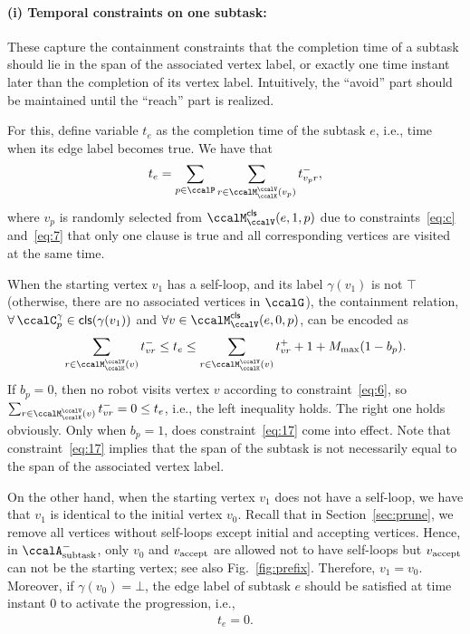 \documentclass[Afour,sageh,times]{sagej}
\newcommand{\clause}[1]{\mathsf{cls}(#1)}
\newcommand{\auto}[1]{\ccalA_{\textup{#1}}}
\newcommand{\vertex}[1]{v_{\textup{#1}}}
\begin{document}
{{{{\paragraph{(i) Temporal constraints on one subtask:}\label{sec:onesubtask} These capture the containment constraints that the completion time of a subtask should lie in the span of the associated vertex label, or exactly one time instant later than the completion of its vertex label. Intuitively, the ``avoid'' part should be maintained until the ``reach'' part is realized.

For this, define variable  $t_e$ as the completion time of the subtask $e$, i.e., time when its edge label  becomes true. We have  that
\begingroup\makeatletter\def\f@size{10}\check@mathfonts
\def\maketag@@@#1{\hbox{\m@th\normalsize\normalfont#1}}%
\begin{align}\label{eq:edgetime}
  t_e = \sum_{p\in \ccalP} \sum_{r\in \ccalM^\ccalV_{\ccalK}(v_p)}t_{v_p r}^-,
\end{align}
\endgroup
where $v_p$ is randomly selected from $\ccalM^\mathsf{cls}_\ccalV(e,1,p)$ due to constraints~\eqref{eq:c} and~\eqref{eq:7} that only one clause is true and all corresponding vertices are visited at the same time.

When the starting vertex $v_1$ has a self-loop, and its label $\gamma(v_1)$ is not  $\top$ (otherwise, there are no associated vertices in $\ccalG$), the containment relation, $\forall\, \ccalC_p^{\gamma} \in \clause{\gamma(v_1)}$ and $\forall v \in \ccalM^\mathsf{cls}_\ccalV(e,0,p)$, can be encoded as
\begingroup\makeatletter\def\f@size{10}\check@mathfonts
\def\maketag@@@#1{\hbox{\m@th\normalsize\normalfont#1}}%
  \begin{align}
 \sum_{r\in \ccalM^\ccalV_{\ccalK}(v)} t_{vr}^-   \leq  t_e \leq
    \sum_{r\in \ccalM^\ccalV_{\ccalK}(v)} t_{vr}^+ + 1  + M_{\text{max}} (1 - b_{p}). \label{eq:17}
  \end{align}
  \endgroup
  If $b_p=0$, then no robot visits vertex $v$ according to constraint~\eqref{eq:6}, so~$ \sum_{r\in \ccalM^\ccalV_{\ccalK}(v)} t_{vr}^- = 0 \leq t_e$, i.e., the left inequality holds. The right one holds obviously. Only when $b_p=1$, does constraint~\eqref{eq:17} come into effect. Note that constraint~\eqref{eq:17} implies that the span of the subtask is not necessarily equal to the span of the associated vertex label.

  On the other hand, when the starting vertex $v_1$ does not have a self-loop, we have that $v_1$ is identical to the initial vertex $v_0$. Recall that in Section~\ref{sec:prune}, we remove all vertices without self-loops except initial and accepting vertices. Hence, in $\auto{subtask}^-$, only $v_0$ and $\vertex{accept}$ are allowed not to have self-loops but $\vertex{accept}$ can not be the starting vertex; see also Fig.~\ref{fig:prefix}. Therefore, $v_1 = v_0$. Moreover, if $\gamma(v_0) = \bot$, the edge label of subtask $e$ should be satisfied at time instant 0 to activate the progression, i.e.,
  \begingroup\makeatletter\def\f@size{10}\check@mathfonts
\def\maketag@@@#1{\hbox{\m@th\normalsize\normalfont#1}}%
  \begin{align}
 t_e = 0. \label{eq:tis0}
  \end{align}
  \endgroup


}}}}
\end{document}
